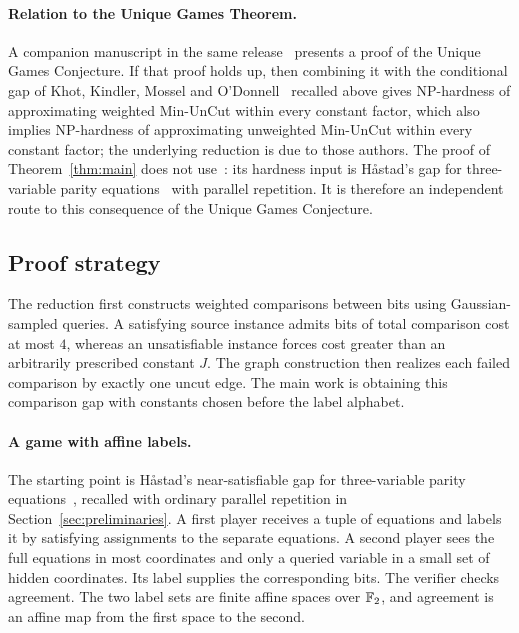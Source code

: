 \paragraph{Relation to the Unique Games Theorem.}
A companion manuscript in the same release~\cite{OpenAIUniqueGames2026}
presents a proof of the Unique Games Conjecture. If that proof holds up,
then combining it with the conditional gap of Khot, Kindler, Mossel and
O'Donnell~\cite{KKMO2007} recalled above gives NP-hardness of
approximating weighted Min-UnCut within every constant factor, which
also implies NP-hardness of approximating unweighted Min-UnCut within
every constant factor; the underlying reduction is due to those authors. The proof of
Theorem~\ref{thm:main} does not use~\cite{OpenAIUniqueGames2026}: its
hardness input is H\aa stad's gap for three-variable parity
equations~\cite{Hastad2001} with parallel repetition. It is therefore an
independent route to this consequence of the Unique Games Conjecture.

\subsection{Proof strategy}

The reduction first constructs weighted comparisons between bits using
Gaussian-sampled queries. A satisfying source instance admits bits of total comparison
cost at most $4$, whereas an unsatisfiable instance forces cost greater than
an arbitrarily prescribed constant $J$. The graph construction then realizes
each failed comparison by exactly one uncut edge. The main work is obtaining
this comparison gap with constants chosen before the label alphabet.

\paragraph{A game with affine labels.}
The starting point is H\aa stad's near-satisfiable gap for three-variable
parity equations~\cite{Hastad2001}, recalled with ordinary parallel
repetition in Section~\ref{sec:preliminaries}. A first player receives a tuple
of equations and labels it by satisfying assignments to the separate
equations. A second player sees the full equations in most coordinates and
only a queried variable in a small set of hidden coordinates. Its label
supplies the corresponding bits. The verifier checks agreement. The two
label sets are finite affine spaces over $\mathbb F_2$, and agreement is an affine
map from the first space to the second.

